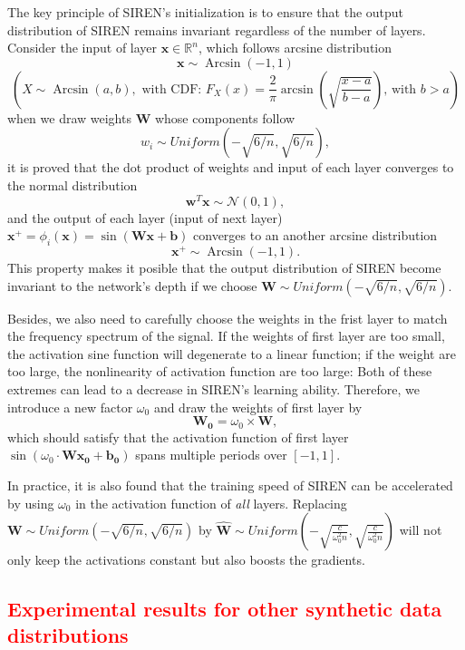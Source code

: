 \documentclass{article}
\begin{document}
The key principle of SIREN's initialization is to ensure that the output distribution of SIREN remains invariant regardless of the number of layers.
Consider the input of layer $\mathbf{x} \in \mathbb{R}^n$, which follows arcsine distribution
$$\mathbf{x}  \sim \operatorname{Arcsin}(-1,1)$$
$$(
X \sim \operatorname{Arcsin}(a, b), \text { with CDF: } F_X(x)=\frac{2}{\pi} \arcsin \left(\sqrt{\frac{x-a}{b-a}}\right) \text {, with } b>a
)$$
when we draw weights $\mathbf{W}$ whose components follow 
$$
w_i \sim Uniform (-\sqrt{6/n}, \sqrt{6/n}),
$$
it is proved that the dot product of weights and input of each layer converges to the normal distribution 
$$
\mathbf{w}^T \mathbf{x} \sim \mathcal{N}\left(0, 1\right),
$$
and the output of each layer (input of next layer) $\mathbf{x}^+=\phi_i\left(\mathbf{x}\right)=\sin \left(\mathbf{W} \mathbf{x}+\mathbf{b}\right)$ converges to an another arcsine distribution
$$\mathbf{x}^+  \sim \operatorname{Arcsin}(-1,1).$$
This property makes it posible that the output distribution of SIREN become invariant to the network's depth if we choose $\mathbf{W} \sim Uniform (-\sqrt{6/n}, \sqrt{6/n}).$


Besides, we also need to carefully choose the weights in the frist layer to match the frequency spectrum of the signal.
If the weights of first layer are too small, the activation sine function will degenerate to a linear function; if the weight are too large, the nonlinearity of activation function are too large:  Both of these extremes can lead to a decrease in SIREN's learning ability.
Therefore, we introduce a new factor $\omega_0$  and  draw the weights of first layer by
$$
\mathbf{W_0} = \omega_0 \times \mathbf{W},
$$
which should satisfy that the activation function of first layer $\sin \left(\omega_0 \cdot \mathbf{W} \mathbf{x_0}+\mathbf{b_0}\right)$ spans multiple periods over $[-1,1]$.

In practice, it is also found that the training speed of SIREN can be accelerated by using $\omega_0$ in the activation function of \textit{all} layers.
Replacing $\mathbf{W} \sim Uniform (-\sqrt{6/n}, \sqrt{6/n})$ by
$
\widehat {\mathbf{W}} \sim Uniform\left(-\sqrt{\frac{c}{\omega_0^2 n}}, \sqrt{\frac{c}{\omega_0^2 n}}\right)
$ 
will not only keep the activations constant but also boosts the gradients.

\textcolor{red}{
\subsection{Experimental results for other synthetic data distributions}}
\label{Experiments}
\end{document}
